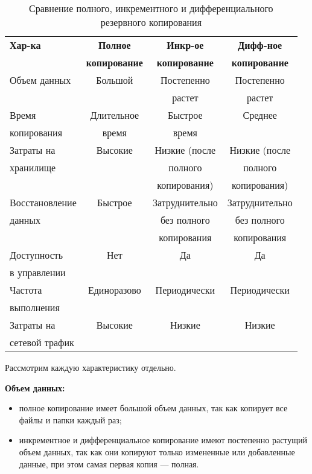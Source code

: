 \begin{table}[h]
  \centering
  \caption{Сравнение полного, инкрементного и дифференциального резервного копирования}
  \begin{tabular}{|l|c|c|c|}
    \hline
    \textbf{Хар-ка} & \textbf{Полное} & \textbf{Инкр-ое} & \textbf{Дифф-ное} \\
    & \textbf{копирование} & \textbf{копирование} & \textbf{копирование} \\
    \hline
    Объем данных & Большой & Постепенно & Постепенно \\
    & & растет & растет \\
    \hline
    Время & Длительное & Быстрое & Среднее \\
    копирования & время & время & \\
    \hline
    Затраты на & Высокие & Низкие (после & Низкие (после \\
    хранилище & & полного & полного \\
    & & копирования) & копирования) \\
    \hline
    Восстановление & Быстрое & Затруднительно & Затруднительно \\
    данных & & без полного & без полного \\
    & & копирования & копирования \\
    \hline
    Доступность & Нет & Да & Да \\
    в управлении & & & \\
    \hline
    Частота & Единоразово & Периодически & Периодически \\
    выполнения & & & \\
    \hline
    Затраты на & Высокие & Низкие & Низкие \\
    сетевой трафик & & & \\
    \hline
  \end{tabular}
\end{table}


Рассмотрим каждую характеристику отдельно.

\begin{flushleft}
\textbf{Объем данных:}  
\end{flushleft}

\begin{itemize}
\item полное копирование имеет большой объем данных, так как копирует все файлы и папки каждый раз;

\item инкрементное и дифференциальное копирование имеют постепенно растущий объем данных, так как они копируют только измененные или добавленные данные, при этом самая первая копия --- полная.
\end{itemize}

